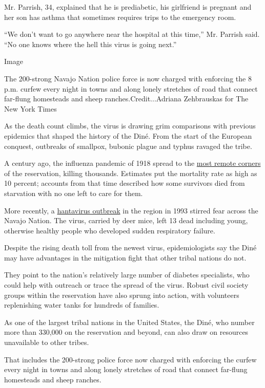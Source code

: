 Mr. Parrish, 34, explained that he is prediabetic, his girlfriend is
pregnant and her son has asthma that sometimes requires trips to the
emergency room.

``We don't want to go anywhere near the hospital at this time,'' Mr.
Parrish said. ``No one knows where the hell this virus is going next.''

Image

The 200-strong Navajo Nation police force is now charged with enforcing
the 8 p.m. curfew every night in towns and along lonely stretches of
road that connect far-flung homesteads and sheep
ranches.Credit...Adriana Zehbrauskas for The New York Times

As the death count climbs, the virus is drawing grim comparisons with
previous epidemics that shaped the history of the Diné. From the start
of the European conquest, outbreaks of smallpox, bubonic plague and
typhus ravaged the tribe.

A century ago, the influenza pandemic of 1918 spread to the
\href{https://www.jstor.org/stable/pdf/10.5250/amerindiquar.38.4.0459.pdf?refreqid=excelsior\%3A70667e3ff079d8c69050297f2972d443}{most
remote corners} of the reservation, killing thousands. Estimates put the
mortality rate as high as 10 percent; accounts from that time described
how some survivors died from starvation with no one left to care for
them.

More recently, a
\href{https://www.aaas.org/virus-rocked-four-corners-reemerges}{hantavirus
outbreak} in the region in 1993 stirred fear across the Navajo Nation.
The virus, carried by deer mice, left 13 dead including young, otherwise
healthy people who developed sudden respiratory failure.

Despite the rising death toll from the newest virus, epidemiologists say
the Diné may have advantages in the mitigation fight that other tribal
nations do not.

They point to the nation's relatively large number of diabetes
specialists, who could help with outreach or trace the spread of the
virus. Robust civil society groups within the reservation have also
sprung into action, with volunteers replenishing water tanks for
hundreds of families.

As one of the largest tribal nations in the United States, the Diné, who
number more than 330,000 on the reservation and beyond, can also draw on
resources unavailable to other tribes.

That includes the 200-strong police force now charged with enforcing the
curfew every night in towns and along lonely stretches of road that
connect far-flung homesteads and sheep ranches.

